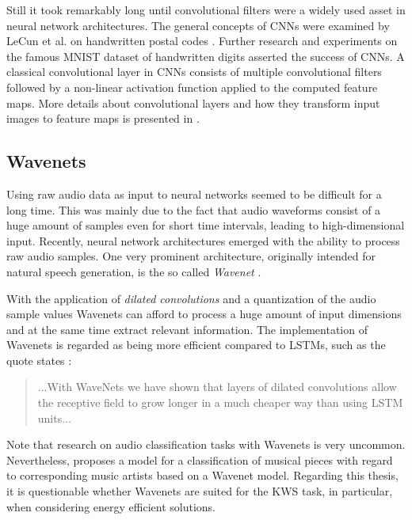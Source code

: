 Still it took remarkably long until convolutional filters were a widely used asset in neural network architectures.
The general concepts of CNNs were examined by LeCun et al. on handwritten postal codes \cite{LeCun1989Generalization}.
Further research and experiments on the famous MNIST dataset of handwritten digits \cite{LeCun1998CnnGradient} asserted the success of CNNs.
A classical convolutional layer in CNNs consists of multiple convolutional filters followed by a non-linear activation function applied to the computed feature maps.
More details about convolutional layers and how they transform input images to feature maps is presented in .



\subsection{Wavenets}\label{sec:prev_nn_wavenet}
Using raw audio data as input to neural networks seemed to be difficult for a long time.
This was mainly due to the fact that audio waveforms consist of a huge amount of samples even for short time intervals, leading to high-dimensional input.
Recently, neural network architectures emerged with the ability to process raw audio samples.
One very prominent architecture, originally intended for natural speech generation, is the so called \emph{Wavenet} \cite{Oord2016Wavenet}.

With the application of \emph{dilated convolutions} and a quantization of the audio sample values Wavenets can afford to process a huge amount of input dimensions and at the same time extract relevant information.
The implementation of Wavenets is regarded as being more efficient compared to LSTMs, such as the quote states \cite{Oord2016Wavenet}:
\begin{quote}
  ...With WaveNets we have shown that layers of dilated convolutions allow the receptive field to grow longer in a much cheaper way than using LSTM units...
\end{quote}
Note that research on audio classification tasks with Wavenets is very uncommon.
Nevertheless, \cite{Zhang2020WavenetMusic} proposes a model for a classification of musical pieces with regard to corresponding music artists based on a Wavenet model.
Regarding this thesis, it is questionable whether Wavenets are suited for the KWS task, in particular, when considering energy efficient solutions.



